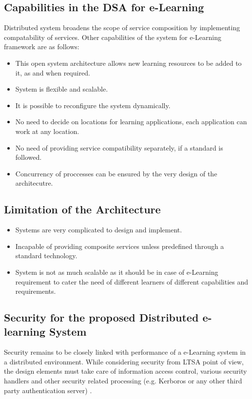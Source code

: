 \subsection{Capabilities in the DSA for e-Learning}
Distributed system broadens the scope of service composition by implementing
compatability of services. Other capabilities of the system for e-Learning framework
are as follows:
\begin{itemize}
 \item This open system architecture allows new learning resources to be added to
it, as and when required.
 \item System is flexible and scalable.
 \item It is possible to reconfigure the system dynamically.
  \item No need to decide on locations for learning applications, each application can
work at any location.
 \item No need of providing service compatibility separately, if a standard is followed.
\item Concurrency of proccesses can be ensured by the very design of the architecutre.

\end{itemize}



\subsection{Limitation of the Architecture}
\begin{itemize}
 \item Systems are very complicated to design and implement.
\item Incapable of providing composite services unless predefined through a standard
 technology.
\item System is not as much scalable as it should be in case of e-Learning requirement
 to cater the need of different learners of different capabilities and requirements.

\end{itemize}

\subsection{Security for the proposed Distributed e-learning System}
Security remains to be closely linked with performance of a e-Learning system in
a distributed environment. While considering security from LTSA point of view,
the design elements must take care of information access control, various security
handlers and other security related processing (e.g. Kerboros or any other third
party authentication server) \cite{fox}.
